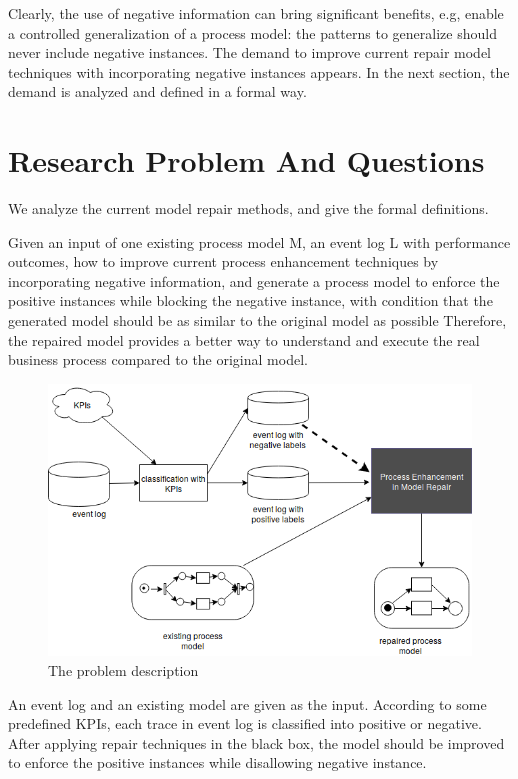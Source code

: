 Clearly, the use of negative information can bring significant benefits, e.g, enable a controlled generalization of a process model: the patterns to generalize should never include negative instances. The demand to improve current repair model techniques with incorporating negative instances appears. In the next section, the demand is analyzed and defined in a formal way.

\section{Research Problem And Questions}
We analyze the current model repair methods, and give the formal definitions.
\begin{definition}
Given an input of one existing process model M, an event log L with performance outcomes, how  to improve current process enhancement techniques by incorporating negative information, and generate a process model to enforce the positive instances while blocking the negative instance, with condition that the generated model should be as similar to the original model as possible Therefore, the repaired model provides a better way to understand and execute the real business process compared to the original model.
\end{definition}
\begin{figure}
	\centering
	\includegraphics[width=\textwidth]{figures/introduction/FD_approach_blackbox.png}
	\caption{The problem description}
	\label{fig:method_architecture}
\end{figure}
An event log and an existing model are given as the input. According to some predefined KPIs, each trace in event log is classified into positive or negative. After applying repair techniques in the black box, the model should be improved to enforce the positive instances while disallowing negative instance.  


